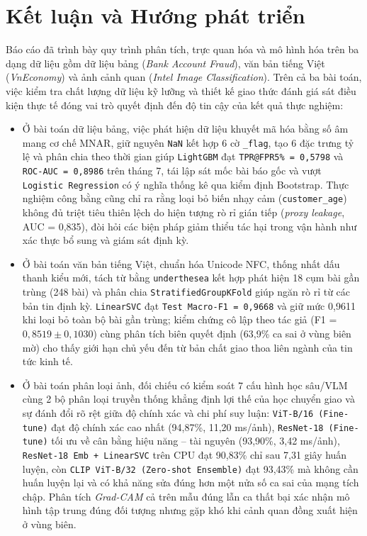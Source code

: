 \section{Kết luận và Hướng phát triển}
\label{sec:conclusion}

Báo cáo đã trình bày quy trình phân tích, trực quan hóa và mô hình hóa trên ba dạng dữ liệu gồm dữ liệu bảng (\textit{Bank Account Fraud}), văn bản tiếng Việt (\textit{VnEconomy}) và ảnh cảnh quan (\textit{Intel Image Classification}). Trên cả ba bài toán, việc kiểm tra chất lượng dữ liệu kỹ lưỡng và thiết kế giao thức đánh giá sát điều kiện thực tế đóng vai trò quyết định đến độ tin cậy của kết quả thực nghiệm:

\begin{itemize}[leftmargin=*]
  \item Ở bài toán dữ liệu bảng, việc phát hiện dữ liệu khuyết mã hóa bằng số âm mang cơ chế MNAR, giữ nguyên \texttt{NaN} kết hợp 6 cờ \texttt{\_flag}, tạo 6 đặc trưng tỷ lệ và phân chia theo thời gian giúp \texttt{LightGBM} đạt \texttt{TPR@FPR5\% = 0,5798} và \texttt{ROC-AUC = 0,8986} trên tháng 7, tái lập sát mốc bài báo gốc và vượt \texttt{Logistic Regression} có ý nghĩa thống kê qua kiểm định Bootstrap. Thực nghiệm công bằng cũng chỉ ra rằng loại bỏ biến nhạy cảm (\texttt{customer\_age}) không đủ triệt tiêu thiên lệch do hiện tượng rò rỉ gián tiếp (\textit{proxy leakage}, AUC = 0,835), đòi hỏi các biện pháp giảm thiểu tác hại trong vận hành như xác thực bổ sung và giám sát định kỳ.
  \item Ở bài toán văn bản tiếng Việt, chuẩn hóa Unicode NFC, thống nhất dấu thanh kiểu mới, tách từ bằng \texttt{underthesea} kết hợp phát hiện 18 cụm bài gần trùng (248 bài) và phân chia \texttt{StratifiedGroupKFold} giúp ngăn rò rỉ từ các bản tin định kỳ. \texttt{LinearSVC} đạt \texttt{Test Macro-F1 = 0,9668} và giữ mức 0,9611 khi loại bỏ toàn bộ bài gần trùng; kiểm chứng cô lập theo tác giả (F1 = $0,8519 \pm 0,1030$) cùng phân tích biên quyết định (63,9\% ca sai ở vùng biên mờ) cho thấy giới hạn chủ yếu đến từ bản chất giao thoa liên ngành của tin tức kinh tế.
  \item Ở bài toán phân loại ảnh, đối chiếu có kiểm soát 7 cấu hình học sâu/VLM cùng 2 bộ phân loại truyền thống khẳng định lợi thế của học chuyển giao và sự đánh đổi rõ rệt giữa độ chính xác và chi phí suy luận: \texttt{ViT-B/16 (Fine-tune)} đạt độ chính xác cao nhất (94,87\%, 11,20 ms/ảnh), \texttt{ResNet-18 (Fine-tune)} tối ưu về cân bằng hiệu năng -- tài nguyên (93,90\%, 3,42 ms/ảnh), \texttt{ResNet-18 Emb + LinearSVC} trên CPU đạt 90,83\% chỉ sau 7,31 giây huấn luyện, còn \texttt{CLIP ViT-B/32 (Zero-shot Ensemble)} đạt 93,43\% mà không cần huấn luyện lại và có khả năng sửa đúng hơn một nửa số ca sai của mạng tích chập. Phân tích \textit{Grad-CAM} cả trên mẫu đúng lẫn ca thất bại xác nhận mô hình tập trung đúng đối tượng nhưng gặp khó khi cảnh quan đồng xuất hiện ở vùng biên.
\end{itemize}

